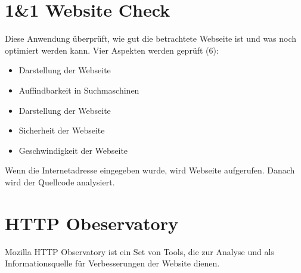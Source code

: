 \section{1\&1 Website Check}

Diese Anwendung überprüft, wie gut die betrachtete Webseite ist und was noch optimiert werden kann. Vier Aspekten werden geprüft (6):
\begin{itemize}
	\item Darstellung der Webseite
	\item Auffindbarkeit in Suchmaschinen
	\item Darstellung der Webseite
	\item Sicherheit der Webseite
	\item Geschwindigkeit der Webseite
\end{itemize}

Wenn die Internetadresse eingegeben wurde, wird Webseite aufgerufen. Danach wird der Quellcode analysiert.

\section{HTTP Obeservatory}

Mozilla HTTP Observatory ist ein Set von Tools, die zur Analyse und als Informationsquelle für Verbesserungen der Website dienen. 
